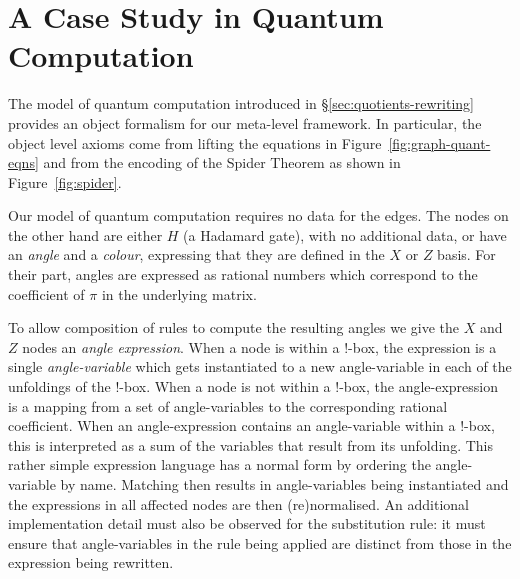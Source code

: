 \documentclass[runningheads]{llncs}
\begin{document}


 

\section{A Case Study in Quantum Computation}
\label{sec:case-study}

The model of quantum computation introduced in
\S\ref{sec:quotients-rewriting} provides an object formalism for our
meta-level framework. In particular, the object level axioms come from
lifting the equations in Figure~\ref{fig:graph-quant-eqns} and from
the encoding of the Spider Theorem as shown in
Figure~\ref{fig:spider}.


Our model of quantum computation requires no data for the edges. The
nodes on the other hand are either $H$ (a Hadamard gate), with no
additional data, or have an \emph{angle} and a \emph{colour}, expressing that
they are defined in the $X$ or $Z$ basis. For their part, angles are
expressed as rational numbers 
which correspond to the coefficient of $\pi$ in the underlying matrix.

To allow composition of rules to compute the resulting angles we give
the $X$ and $Z$ nodes an \emph{angle expression}. When a node is
within a !-box, the expression is a single \emph{angle-variable} which
gets instantiated to a new angle-variable in each of the unfoldings of
the !-box.  When a node is not within a !-box, the angle-expression is
a mapping from a set of angle-variables to the corresponding rational
coefficient. When an angle-expression contains an angle-variable within
a !-box, this is interpreted as a sum of the variables that result
from its unfolding.  This rather simple expression language has a
normal form by ordering the angle-variable by name.  Matching then
results in angle-variables being instantiated and the expressions in
all affected nodes are then (re)normalised. An additional
implementation detail must also be observed for the substitution rule:
it must ensure that angle-variables in the rule being applied are
distinct from those in the expression being rewritten.
\end{document}
